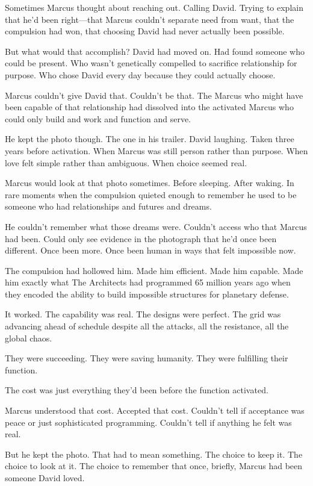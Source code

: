 Sometimes Marcus thought about reaching out. Calling David. Trying to explain that he'd been right—that Marcus couldn't separate need from want, that the compulsion had won, that choosing David had never actually been possible.

But what would that accomplish? David had moved on. Had found someone who could be present. Who wasn't genetically compelled to sacrifice relationship for purpose. Who chose David every day because they could actually choose.

Marcus couldn't give David that. Couldn't be that. The Marcus who might have been capable of that relationship had dissolved into the activated Marcus who could only build and work and function and serve.

He kept the photo though. The one in his trailer. David laughing. Taken three years before activation. When Marcus was still person rather than purpose. When love felt simple rather than ambiguous. When choice seemed real.

Marcus would look at that photo sometimes. Before sleeping. After waking. In rare moments when the compulsion quieted enough to remember he used to be someone who had relationships and futures and dreams.

He couldn't remember what those dreams were. Couldn't access who that Marcus had been. Could only see evidence in the photograph that he'd once been different. Once been more. Once been human in ways that felt impossible now.

The compulsion had hollowed him. Made him efficient. Made him capable. Made him exactly what The Architects had programmed 65 million years ago when they encoded the ability to build impossible structures for planetary defense.

It worked. The capability was real. The designs were perfect. The grid was advancing ahead of schedule despite all the attacks, all the resistance, all the global chaos.

They were succeeding. They were saving humanity. They were fulfilling their function.

The cost was just everything they'd been before the function activated.

Marcus understood that cost. Accepted that cost. Couldn't tell if acceptance was peace or just sophisticated programming. Couldn't tell if anything he felt was real.

But he kept the photo. That had to mean something. The choice to keep it. The choice to look at it. The choice to remember that once, briefly, Marcus had been someone David loved.

